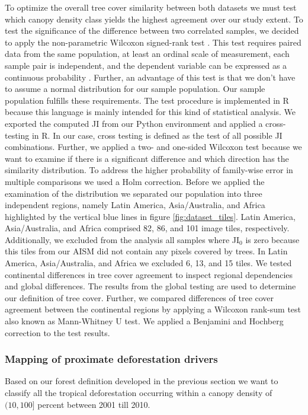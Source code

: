 			To optimize the overall tree cover similarity between both datasets we must test which canopy density class yields the highest agreement over our study extent. To test the significance of the difference between two correlated samples, we decided to apply the non-parametric Wilcoxon signed-rank test \citep{Wilcoxon1945}. This test requires paired data from the same population, at least an ordinal scale of measurement, each sample pair is independent, and the dependent variable can be expressed as a continuous probability \citep{Lowry2019}. Further, an advantage of this test is that we don't have to assume a normal distribution for our sample population. Our sample population fulfills these requirements.  The test procedure is implemented in R because this language is mainly intended for this kind of statistical analysis. We exported the computed \ac{JI} from our Python environment and applied a cross-testing in R. In our case, cross testing is defined as the test of all possible \ac{JI} combinations. Further, we applied a two- and one-sided Wilcoxon test because we want to examine if there is a significant difference and which direction has the similarity distribution. To address the higher probability of family-wise error in multiple comparisons we used a Holm correction. Before we applied the examination of the distribution we separated our population into three independent regions, namely Latin America, Asia/Australia, and Africa highlighted by the vertical blue lines in figure \ref{fig:dataset_tiles}. Latin America, Asia/Australia, and Africa comprised 82, 86, and 101 image tiles, respectively. Additionally, we excluded from the analysis all samples where JI$_0$ is zero because this tiles from our \ac{AISM} did not contain any pixels covered by trees. In Latin America, Asia/Australia, and Africa we excluded 6, 13, and 15 tiles. We tested continental differences in tree cover agreement to inspect regional dependencies and global differences. The results from the global testing are used to determine our definition of tree cover. Further, we compared differences of tree cover agreement between the continental regions by applying a Wilcoxon rank-sum test also known as Mann-Whitney U test. We applied a Benjamini and Hochberg correction to the test results.
 
		\subsubsection{Mapping of proximate deforestation drivers}
		\label{subsubsec:methods_proximate_deforestation_driver}
			Based on our forest definition developed in the previous section we want to classify all the tropical deforestation occurring within a canopy density of $(10,100]$ percent between 2001 till 2010. 

